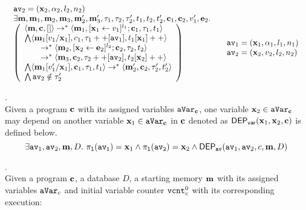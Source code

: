 {{\begin{defn}
\[\begin{array}{ll}
\begin{array}{l}
\av_2 = (\ssa{x}_2, \qval_2, l_2, n_2)
\end{array}
\\
\begin{array}{l}
\exists \ssa{m}, \ssa{m}_1, \ssa{m}_2, \ssa{m}_3, \ssa{m}_2', \ssa{m}_3', 
\vtrace_1, \vtrace_2, \vtrace_2', t_1, t_2, t_2', \ssa{c}_1, \ssa{c}_2, v_1', \sexpr_2.
\\
  \left(
  \begin{array}{l}   
\config{\ssa{m}, \ssa{c}, []} \rightarrow^{*} 
\config{\ssa{m}_1, [\assign{\ssa{x}_1}{v_1}]^{l_1} ; \ssa{c}_1, \vtrace_1, t_1} 
\\ 
 \bigwedge
 \config{\ssa{m}_1[v_1/\ssa{x}_1], c_1, \vtrace_1 ++ [\av_1], t_1[\ssa{x}_1]++} 
 \\
\qquad \rightarrow^{*} 
\config{\ssa{m}_2, [\assign{\ssa{x}_2}{\sexpr_2}]^{l_2} ; \ssa{c}_2, \vtrace_2, t_2} 
\\
\qquad \rightarrow^{*} 
\config{\ssa{m}_3, \ssa{c}_2,  \vtrace_2 ++ [\av_2], t_2[\ssa{x}_2]++} 
 \\ 
 \bigwedge
 \config{\ssa{m}_1[v_1'/\ssa{x}_1], \ssa{c}_1, \vtrace_1, t_1} 
\rightarrow^{*} 
\config{\ssa{m}_2', \ssa{c}_2,  \vtrace_2', t_2'}
\\
\bigwedge
\av_2 \notin \vtrace_2'
\end{array}
\right)
\end{array} 
&
\begin{array}{l}
\av_1 = (\ssa{x}_1, \qval_1, l_1, n_1)
\\
\av_2 = (\ssa{x}_2, v_2, l_2, n_2)
\end{array}
\end{array}
 \]
%
\end{defn}
%
\begin{defn}.
\label{def:var_dep}
\\
Given a program ${\boldsymbol{\mathbf{c}}}$ with its assigned variables $\mathtt{aVar}_{{\boldsymbol{\mathbf{c}}}}$, 
one variable ${\boldsymbol{\mathbf{x}}}_2 \in \mathtt{aVar}_{{\boldsymbol{\mathbf{c}}}}$ may depend on another variable 
${\boldsymbol{\mathbf{x}}}_1 \in \mathtt{aVar}_{{\boldsymbol{\mathbf{c}}}}$ in ${\boldsymbol{\mathbf{c}}}$ denoted as 
%
$\mathsf{DEP_{var}}({\boldsymbol{\mathbf{x}}}_1, {\boldsymbol{\mathbf{x}}}_2, {\boldsymbol{\mathbf{c}}})$ is defined below.
%
\[
\exists \mathtt{av}_1, \mathtt{av}_2, {\boldsymbol{\mathbf{m}}}, D. ~
\mathtt{\pi_{l}(\mathtt{av}_1)} = {\boldsymbol{\mathbf{x}}}_1
\land
\mathtt{\pi_{l}(\mathtt{av}_2)} = {\boldsymbol{\mathbf{x}}}_2
\land 
\mathsf{DEP_{\mathtt{av}}}(\mathtt{av}_1, \mathtt{av}_2, c, {\boldsymbol{\mathbf{m}}}, D)
\] 
%
%
\end{defn}
%
%
\begin{defn}.
\\
Given a program ${\boldsymbol{\mathbf{c}}}$, a database $D$, a starting memory ${\boldsymbol{\mathbf{m}}}$ with its assigned variables $\mathtt{aVar}_c$ and initial variable counter $\mathtt{vcnt}^0_{c}$ with its corresponding execution:

\end{defn}}}
